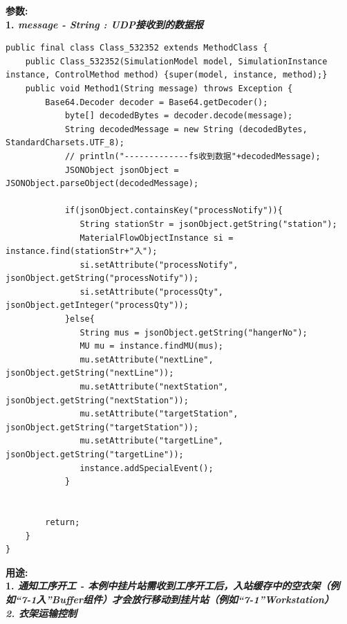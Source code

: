 \noindent\bf{参数}:\\
1. \it{message} - String : UDP接收到的数据报
\begin{lstlisting}
public final class Class_532352 extends MethodClass {
    public Class_532352(SimulationModel model, SimulationInstance instance, ControlMethod method) {super(model, instance, method);}
    public void Method1(String message) throws Exception {
        Base64.Decoder decoder = Base64.getDecoder();
            byte[] decodedBytes = decoder.decode(message);
            String decodedMessage = new String (decodedBytes, StandardCharsets.UTF_8);
            // println("-------------fs收到数据"+decodedMessage);
            JSONObject jsonObject = JSONObject.parseObject(decodedMessage);
   
            if(jsonObject.containsKey("processNotify")){
               String stationStr = jsonObject.getString("station");
               MaterialFlowObjectInstance si = instance.find(stationStr+"入");
               si.setAttribute("processNotify", jsonObject.getString("processNotify"));
               si.setAttribute("processQty", jsonObject.getInteger("processQty"));
            }else{
               String mus = jsonObject.getString("hangerNo");
               MU mu = instance.findMU(mus);
               mu.setAttribute("nextLine", jsonObject.getString("nextLine"));
               mu.setAttribute("nextStation", jsonObject.getString("nextStation"));
               mu.setAttribute("targetStation", jsonObject.getString("targetStation"));
               mu.setAttribute("targetLine", jsonObject.getString("targetLine"));
               instance.addSpecialEvent();
            }
   
           
        return;
    }
}
\end{lstlisting}\vspace{-30pt}
\noindent\bf{用途}:\\
1. \it{通知工序开工} - 本例中挂片站需收到工序开工后，入站缓存中的空衣架（例如“7-1入”Buffer组件）才会放行移动到挂片站（例如“7-1”Workstation）\\
2. \it{衣架运输控制}\\


